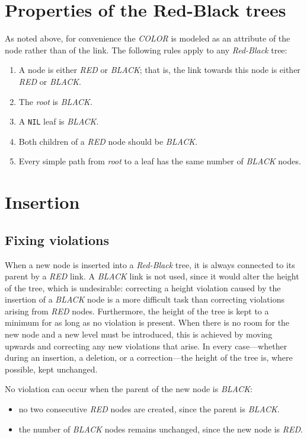 \documentclass{article}
\begin{document}
\section{Properties of the Red-Black trees}
As noted above, for convenience the \emph{COLOR} is modeled as an attribute of the node rather than of the link.
The following rules apply to any \emph{Red-Black} tree:
\begin{enumerate}
   \item A node is either \emph{RED} or \emph{BLACK};
   that is, the link towards this node is either \emph{RED} or \emph{BLACK}.
   \item The \emph{root} is \emph{BLACK}.
   \item A \texttt{NIL} leaf is \emph{BLACK}.
   \item Both children of a \emph{RED} node should be \emph{BLACK}.
   \item Every simple path from \emph{root} to a leaf has the same number of \emph{BLACK} nodes.
\end{enumerate}

\section{Insertion}

\subsection{Fixing violations}

When a new node is inserted into a \emph{Red-Black} tree, it is always connected to its parent by a \emph{RED} link.
A \emph{BLACK} link is not used, since it would alter the height of the tree, which is undesirable:
correcting a height violation caused by the insertion of a \emph{BLACK} node is a more difficult task than
correcting violations arising from \emph{RED} nodes.
Furthermore, the height of the tree is kept to a minimum for as long as no violation is present.
When there is no room for the new node and a new level must be introduced,
this is achieved by moving upwards and correcting any new violations that arise.
In every case---whether during an insertion, a deletion, or a correction---the height of the tree is,
where possible, kept unchanged.

No violation can occur when the parent of the new node is \emph{BLACK}:
\begin{itemize}
    \item no two consecutive \emph{RED} nodes are created, since the parent is \emph{BLACK}.
    \item the number of \emph{BLACK} nodes remains unchanged, since the new node is \emph{RED}.
\end{itemize}
\end{document}
